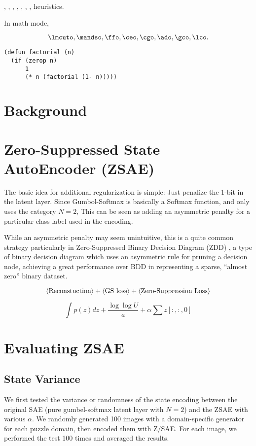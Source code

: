 \lmcuto, \mandso, \ffo, \ceo, \cgo, \ado, \gco, \lco heuristics.

In math mode,

\[
 \lmcuto, \mandso, \ffo, \ceo, \cgo, \ado, \gco, \lco.
\]

\begin{verbatim}
(defun factorial (n)
  (if (zerop n)
      1
      (* n (factorial (1- n)))))
\end{verbatim}

\section{Background}

\section{Zero-Suppressed State AutoEncoder (ZSAE)}

The basic idea for additional regularization is simple: Just penalize the
1-bit in the latent layer. Since Gumbol-Softmax is basically a Softmax function,
and \latentplanner only uses the category $N=2$, This can be seen as adding an
asymmetric penalty for a particular class label used in the encoding.

While an asymmetric penalty may seem unintuitive, this is a quite common
strategy particularly in Zero-Suppressed Binary Decision Diagram (ZDD)
\cite{Minato??}, a type of binary decision diagram \cite{Bryent88} which
uses an asymmetric rule for pruning a decision node, achieving a great
performance over BDD in representing a sparse, ``almost zero'' binary dataset.

\[
 {\left<\text{Reconstuction}\right>} + {\left<\text{GS loss}\right>} + {\left<\text{Zero-Suppression Loss}\right>}
\]

\[
 \int p(z)dz + \frac{\log {\log{U}}}{a} + \alpha \sum z[:,:,0]
\]

\section{Evaluating ZSAE}

\subsection{State Variance}

We first tested the variance or randomness of the state encoding between
the original SAE (pure gumbel-softmax latent layer with $N=2$) and the ZSAE with various $\alpha$.
We randomly generated 100 images with a domain-specific generator for each puzzle domain,
then encoded them with Z/SAE. For each image, we performed the test 100 times and averaged the results.

